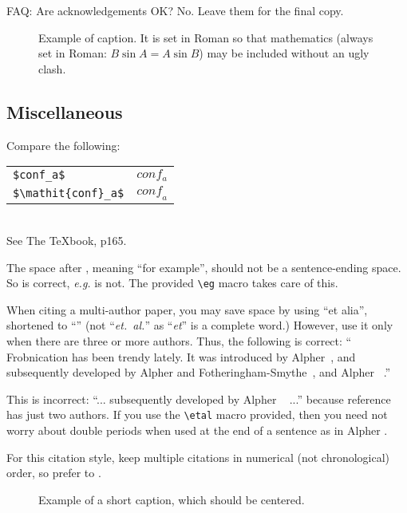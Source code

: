 \documentclass[12pt,letterpaper]{article}
\begin{document}
FAQ: Are acknowledgements OK?  No.  Leave them for the final copy.


\begin{figure}[t]
\begin{center}
\fbox{\rule{0pt}{2in} \rule{0.9\linewidth}{0pt}}
\end{center}
   \caption{Example of caption.  It is set in Roman so that mathematics
   (always set in Roman: $B \sin A = A \sin B$) may be included without an
   ugly clash.}
\label{fig:long}
\label{fig:onecol}
\end{figure}

\subsection{Miscellaneous}

\noindent
Compare the following:\\
\begin{tabular}{ll}
 \verb'$conf_a$' &  $conf_a$ \\
 \verb'$\mathit{conf}_a$' & $\mathit{conf}_a$
\end{tabular}\\
See The \TeX book, p165.

The space after \eg, meaning ``for example'', should not be a
sentence-ending space. So \eg is correct, {\em e.g.} is not.  The provided
\verb'\eg' macro takes care of this.

When citing a multi-author paper, you may save space by using ``et alia'',
shortened to ``\etal'' (not ``{\em et.\ al.}'' as ``{\em et}'' is a complete word.)
However, use it only when there are three or more authors.  Thus, the
following is correct: ``
   Frobnication has been trendy lately.
   It was introduced by Alpher~\cite{Alpher02}, and subsequently developed by
   Alpher and Fotheringham-Smythe~\cite{Alpher03}, and Alpher \etal~\cite{Alpher04}.''

This is incorrect: ``... subsequently developed by Alpher \etal~\cite{Alpher03} ...''
because reference~\cite{Alpher03} has just two authors.  If you use the
\verb'\etal' macro provided, then you need not worry about double periods
when used at the end of a sentence as in Alpher \etal.

For this citation style, keep multiple citations in numerical (not
chronological) order, so prefer \cite{Alpher03,Alpher02} to
\cite{Alpher02,Alpher03}.


\begin{figure*}
\begin{center}
\fbox{\rule{0pt}{2in} \rule{.9\linewidth}{0pt}}
\end{center}
   \caption{Example of a short caption, which should be centered.}
\label{fig:short}
\end{figure*}
\end{document}

